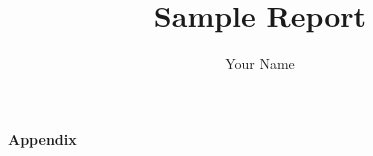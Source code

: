 \documentclass{article}
\title{Sample Report}
\author{Your Name}
\begin{document}
\maketitle










\clearpage
\begin{center}
    {\Large\bf Appendix}
\end{center}
\appendix




\end{document}
